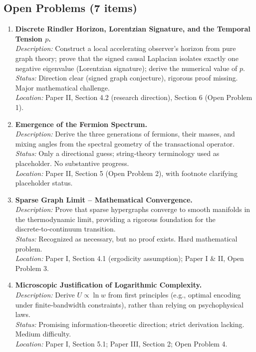 \documentclass{article}
\begin{document}
\subsection*{Open Problems (7 items)}

\begin{enumerate}
    \item \textbf{Discrete Rindler Horizon, Lorentzian Signature, and the Temporal Tension \(p\).} \\
    \textit{Description:} Construct a local accelerating observer’s horizon from pure graph theory; prove that the signed causal Laplacian isolates exactly one negative eigenvalue (Lorentzian signature); derive the numerical value of \(p\). \\
    \textit{Status:} Direction clear (signed graph conjecture), rigorous proof missing. Major mathematical challenge. \\
    \textit{Location:} Paper II, Section 4.2 (research direction), Section 6 (Open Problem 1).

    \item \textbf{Emergence of the Fermion Spectrum.} \\
    \textit{Description:} Derive the three generations of fermions, their masses, and mixing angles from the spectral geometry of the transactional operator. \\
    \textit{Status:} Only a directional guess; string‑theory terminology used as placeholder. No substantive progress. \\
    \textit{Location:} Paper II, Section 5 (Open Problem 2), with footnote clarifying placeholder status.

    \item \textbf{Sparse Graph Limit – Mathematical Convergence.} \\
    \textit{Description:} Prove that sparse hypergraphs converge to smooth manifolds in the thermodynamic limit, providing a rigorous foundation for the discrete‑to‑continuum transition. \\
    \textit{Status:} Recognized as necessary, but no proof exists. Hard mathematical problem. \\
    \textit{Location:} Paper I, Section 4.1 (ergodicity assumption); Paper I \& II, Open Problem 3.

    \item \textbf{Microscopic Justification of Logarithmic Complexity.} \\
    \textit{Description:} Derive \(U \propto \ln w\) from first principles (e.g., optimal encoding under finite‑bandwidth constraints), rather than relying on psychophysical laws. \\
    \textit{Status:} Promising information‑theoretic direction; strict derivation lacking. Medium difficulty. \\
    \textit{Location:} Paper I, Section 5.1; Paper III, Section 2; Open Problem 4.


\end{enumerate}
\end{document}
